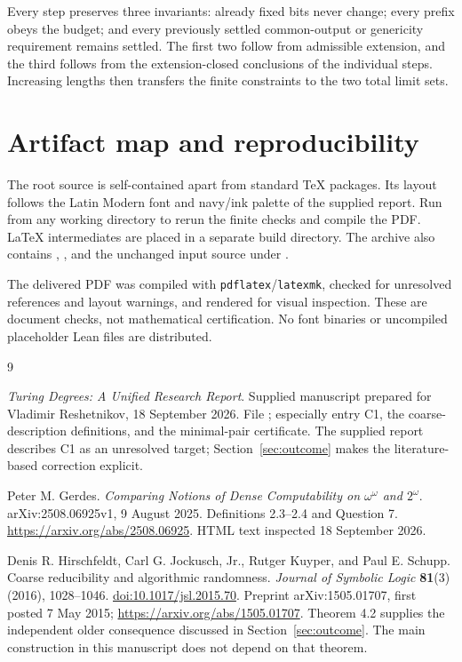 \documentclass[11pt,a4paper]{article}
\theoremstyle{definition}\newtheorem{definition}[theorem]{Definition}
\theoremstyle{remark}\newtheorem{remark}[theorem]{Remark}
\begin{document}
Every step preserves three invariants: already fixed bits never change; every prefix obeys the budget; and every previously settled common-output or genericity requirement remains settled. The first two follow from admissible extension, and the third follows from the extension-closed conclusions of the individual steps. Increasing lengths then transfers the finite constraints to the two total limit sets.

\clearpage
\section{Artifact map and reproducibility}
The root source  is self-contained apart from standard TeX packages. Its layout follows the Latin Modern font and navy/ink palette of the supplied report. Run  from any working directory to rerun the finite checks and compile the PDF. LaTeX intermediates are placed in a separate build directory. The archive also contains , , and the unchanged input source under .

The delivered PDF was compiled with \texttt{pdflatex}/\texttt{latexmk}, checked for unresolved references and layout warnings, and rendered for visual inspection. These are document checks, not mathematical certification. No font binaries or uncompiled placeholder Lean files are distributed.

\begin{thebibliography}{9}
\raggedright
{}
\emph{Turing Degrees: A Unified Research Report}.
Supplied manuscript prepared for Vladimir Reshetnikov, 18 September 2026.
File ; especially entry C1, the coarse-description definitions, and the minimal-pair certificate. The supplied report describes C1 as an unresolved target; Section~\ref{sec:outcome} makes the literature-based correction explicit.

Peter M. Gerdes.
\emph{Comparing Notions of Dense Computability on $\omega^\omega$ and $2^\omega$}.
arXiv:2508.06925v1, 9 August 2025.
Definitions 2.3--2.4 and Question 7.
\url{https://arxiv.org/abs/2508.06925}.
HTML text inspected 18 September 2026.

Denis R. Hirschfeldt, Carl G. Jockusch, Jr., Rutger Kuyper, and Paul E. Schupp.
Coarse reducibility and algorithmic randomness.
\emph{Journal of Symbolic Logic} \textbf{81}(3) (2016), 1028--1046.
\href{https://doi.org/10.1017/jsl.2015.70}{doi:10.1017/jsl.2015.70}.
Preprint arXiv:1505.01707, first posted 7 May 2015;
\url{https://arxiv.org/abs/1505.01707}.
Theorem 4.2 supplies the independent older consequence discussed in Section~\ref{sec:outcome}. The main construction in this manuscript does not depend on that theorem.
\end{thebibliography}
\end{document}
